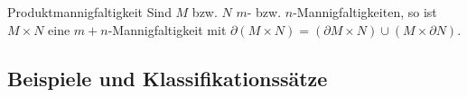 \begin{Satz}{Produktmannigfaltigkeit}
    Sind $M$ bzw. $N$ $m$- bzw. $n$-Mannigfaltigkeiten, so ist
    $M \times N$ eine $m + n$-Mannigfaltigkeit mit
    $\partial (M \times N) = (\partial M \times N) \cup (M \times \partial N)$.
\end{Satz}






\pagebreak

\subsection{%
    Beispiele und Klassifikationssätze%
}

